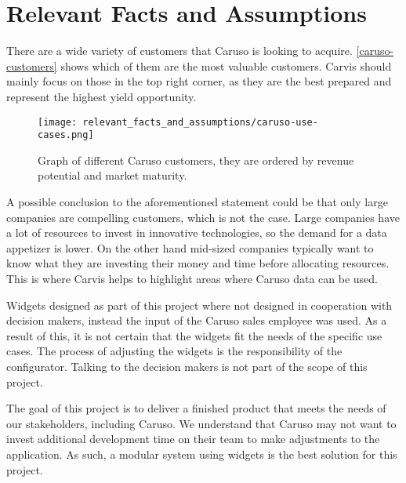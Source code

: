 \chapter{Relevant Facts and Assumptions}

There are a wide variety of customers that Caruso is looking to acquire. \autoref{caruso-customers} shows which of them are the most valuable customers. Carvis should mainly focus on those in the top right corner, as they are the best prepared and represent the highest yield opportunity.

\begin{figure}[ht]
  \centering
  \texttt{[image: relevant\_facts\_and\_assumptions/caruso-use-cases.png]}
  \caption{Graph of different Caruso customers, they are ordered by revenue potential and market maturity.}
  \label{caruso-customers}
\end{figure}

A possible conclusion to the aforementioned statement could be that only large companies are compelling customers, which is not the case. Large companies have a lot of resources to invest in innovative technologies, so the demand for a data appetizer is lower. On the other hand mid-sized companies typically want to know what they are investing their money and time before allocating resources. This is where Carvis helps to highlight areas where Caruso data can be used.

Widgets designed as part of this project where not designed in cooperation with decision makers, instead the input of the Caruso sales employee was used. As a result of this, it is not certain that the widgets fit the needs of the specific use cases. The process of adjusting the widgets is the responsibility of the configurator. Talking to the decision makers is not part of the scope of this project.

The goal of this project is to deliver a finished product that meets the needs of our stakeholders, including Caruso. We understand that Caruso may not want to invest additional development time on their team to make adjustments to the application. As such, a modular system using widgets is the best solution for this project.